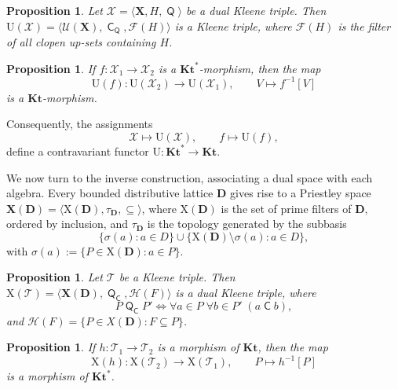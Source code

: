 \documentclass[10pt,a4paper]{amsart}
\newtheorem{proposition}[theorem]{Proposition}
\DeclareMathOperator{\con}{\mathsf{C}}
\DeclareMathOperator{\Q}{\mathsf{Q}}
\newcommand{\D}{\mathbf{D}}
\newcommand{\X}{\mathbf{X}}
\newcommand{\T}{\mathcal{T}}
\newcommand{\U}{\mathcal{U}}
\begin{document}
\begin{proposition}
\label{prop:dual-to-triple}
Let $\mathcal{X} = \langle \X, H, \Q \rangle$ be a dual Kleene triple. Then $\mathrm{U}(\mathcal{X}) = \langle \U(\X), \con_{\Q}, \mathcal{F}(H) \rangle$ is a Kleene triple, where $\mathcal{F}(H)$ is the filter of all clopen up-sets containing $H$.
\end{proposition}

\begin{proposition}
\label{prop:Uf-Kt-morphism}
If $f \colon \mathcal{X}_1 \to \mathcal{X}_2$ is a $\mathbf{Kt}^{*}$-morphism, then the map
\[
\mathrm{U}(f) \colon \mathrm{U}(\mathcal{X}_2) \to \mathrm{U}(\mathcal{X}_1), \qquad V \mapsto f^{-1}[V]
\]
is a $\mathbf{Kt}$-morphism.
\end{proposition}

Consequently, the assignments
\[
\mathcal{X} \longmapsto \mathrm{U}(\mathcal{X}), \qquad f \longmapsto \mathrm{U}(f),
\]
define a contravariant functor $\mathrm{U} \colon \mathbf{Kt}^{*} \longrightarrow \mathbf{Kt}$.

We now turn to the inverse construction, associating a dual space with each algebra. Every bounded distributive lattice $\D$ gives rise to a Priestley space $\X(\D) = \langle \mathrm{X}(\D), \tau_{\D}, \subseteq \rangle$, where $\mathrm{X}(\D)$ is the set of prime filters of $\D$, ordered by inclusion, and $\tau_{\D}$ is the topology generated by the subbasis
\[
\{\sigma(a) : a \in D\} \cup \{\mathrm{X}(\D) \setminus \sigma(a) : a \in D\},
\]
with $\sigma(a) := \{P \in \mathrm{X}(\D) : a \in P\}$.

\begin{proposition}
\label{prop:triple-to-dual}
Let $\T$ be a Kleene triple. Then $\mathrm{X}(\T) = \langle \X(\D), \Q_{\con}, \mathcal{H}(F) \rangle$ is a dual Kleene triple, where
\begin{equation}
\label{eq:dual-contact}
     P\Q_{\con} P' \iff \forall a \in P \; \forall b \in P' \; (a \con b),\tag{DC}
\end{equation}
and $\mathcal{H}(F) = \{P \in X(\D) : F \subseteq P\}$.
\end{proposition}

\begin{proposition}
\label{prop:Xh-Kt-morphism}
If $h \colon \T_1 \to \T_2$ is a morphism of $\mathbf{Kt}$, then the map
\[
\mathrm{X}(h) \colon \mathrm{X}(\T_2) \to \mathrm{X}(\T_1), \qquad P \mapsto h^{-1}[P]
\]
is a morphism of $\mathbf{Kt}^{*}$.
\end{proposition}
\end{document}

